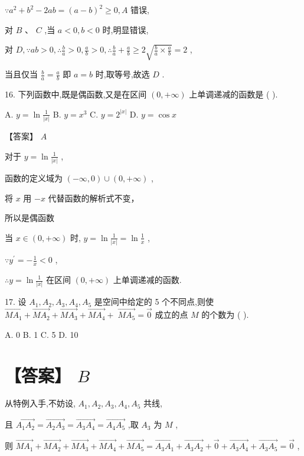 \documentclass[10pt]{article}
\begin{document}
\(\because {a}^{2} + {b}^{2} - {2ab} = {\left( a - b\right) }^{2} \geq  0,A\) 错误,

对 \(B\text{ 、 }C\) ,当 \(a < 0,b < 0\) 时,明显错误,

对 \(D,\because {ab} > 0,\therefore \frac{b}{a} > 0,\frac{a}{b} > 0,\therefore \frac{b}{a} + \frac{a}{b} \geq  2\sqrt{\frac{b}{a} \times  \frac{a}{b}} = 2\) ,

当且仅当 \(\frac{b}{a} = \frac{a}{b}\) 即 \(a = b\) 时,取等号,故选 \(D\) .

16. 下列函数中,既是偶函数,又是在区间 \(\left( {0, + \infty }\right)\) 上单调递减的函数是 ( ).

A. \(y = \ln \frac{1}{\left| x\right| }\) B. \(y = {x}^{3}\) C. \(y = {2}^{\left| x\right| }\) D. \(y = \cos x\)

【答案】 \(A\)

对于 \(y = \ln \frac{1}{\left| x\right| }\) ,

函数的定义域为 \(\left( {-\infty ,0}\right)  \cup  \left( {0, + \infty }\right)\) ,

将 \(x\) 用 \(- x\) 代替函数的解析式不变，

所以是偶函数

当 \(x \in  \left( {0, + \infty }\right)\) 时, \(y = \ln \frac{1}{\left| x\right| } = \ln \frac{1}{x}\) ,

\(\because {y}^{\prime } =  - \frac{1}{x} < 0\) ,

\(\therefore y = \ln \frac{1}{\left| x\right| }\) 在区间 \(\left( {0, + \infty }\right)\) 上单调递减的函数.

17. 设 \({A}_{1},{A}_{2},{A}_{3},{A}_{4},{A}_{5}\) 是空间中给定的 5 个不同点,则使 \(\overrightarrow{M{A}_{1}} + \overrightarrow{M{A}_{2}} + \overrightarrow{M{A}_{3}} + \overrightarrow{M{A}_{4}} + \; \overrightarrow{M{A}_{5}} = \overrightarrow{0}\) 成立的点 \(M\) 的个数为 ( ).

A. 0 B. 1 C. 5 D. 10

\section*{【答案】 \(B\)}

从特例入手,不妨设, \({A}_{1},{A}_{2},{A}_{3},{A}_{4},{A}_{5}\) 共线,

且 \(\overrightarrow{{A}_{1}{A}_{2}} = \overrightarrow{{A}_{2}{A}_{3}} = \overrightarrow{{A}_{3}{A}_{4}} = \overrightarrow{{A}_{4}{A}_{5}}\) ,取 \({A}_{3}\) 为 \(M\) ,

则 \(\overrightarrow{M{A}_{1}} + \overrightarrow{M{A}_{2}} + \overrightarrow{M{A}_{3}} + \overrightarrow{M{A}_{4}} + \overrightarrow{M{A}_{5}} = \overrightarrow{{A}_{3}{A}_{1}} + \overrightarrow{{A}_{3}{A}_{2}} + \overrightarrow{0} + \overrightarrow{{A}_{3}{A}_{4}} + \overrightarrow{{A}_{3}{A}_{5}} = \overrightarrow{0}\) ,
\end{document}

